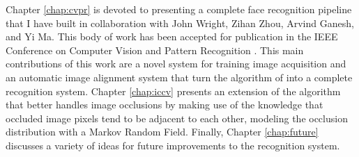 Chapter \ref{chap:cvpr} is devoted to presenting a complete face recognition
pipeline that I have built in collaboration with John Wright, Zihan Zhou,
Arvind Ganesh, and Yi Ma.  This body of work has been accepted for publication
in the IEEE Conference on Computer Vision and Pattern Recognition
\cite{Wagner2009-CVPR}.  This main contributions of this work are a novel
system for training image acquisition and an automatic image alignment system
that turn the algorithm of \cite{Wright2009-PAMI} into a complete recognition
system.  Chapter \ref{chap:iccv} presents an extension of the algorithm that
better handles image occlusions by making use of the knowledge that occluded
image pixels tend to be adjacent to each other, modeling the occlusion
distribution with a Markov Random Field.  Finally, Chapter \ref{chap:future}
discusses a variety of ideas for future improvements to the recognition system.




